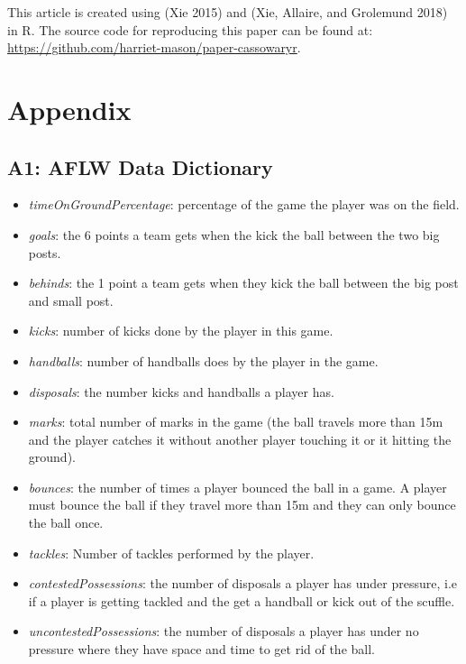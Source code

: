 This article is created using  (Xie 2015) and  (Xie, Allaire, and Grolemund 2018) in R. The source code for reproducing this paper can be found at: \url{https://github.com/harriet-mason/paper-cassowaryr}.

\hypertarget{appendix}{%
\section{Appendix}\label{appendix}}

\hypertarget{a1-aflw-data-dictionary}{%
\subsection{A1: AFLW Data Dictionary}\label{a1-aflw-data-dictionary}}

\begin{itemize}
\tightlist
\item
  \emph{timeOnGroundPercentage}: percentage of the game the player was on the field.
\item
  \emph{goals}: the 6 points a team gets when the kick the ball between the two big posts.
\item
  \emph{behinds}: the 1 point a team gets when they kick the ball between the big post and small post.
\item
  \emph{kicks}: number of kicks done by the player in this game.
\item
  \emph{handballs}: number of handballs does by the player in the game.
\item
  \emph{disposals}: the number kicks and handballs a player has.
\item
  \emph{marks}: total number of marks in the game (the ball travels more than 15m and the player catches it without another player touching it or it hitting the ground).
\item
  \emph{bounces}: the number of times a player bounced the ball in a game. A player must bounce the ball if they travel more than 15m and they can only bounce the ball once.
\item
  \emph{tackles}: Number of tackles performed by the player.
\item
  \emph{contestedPossessions}: the number of disposals a player has under pressure, i.e if a player is getting tackled and the get a handball or kick out of the scuffle.
\item
  \emph{uncontestedPossessions}: the number of disposals a player has under no pressure where they have space and time to get rid of the ball.

\end{itemize}
